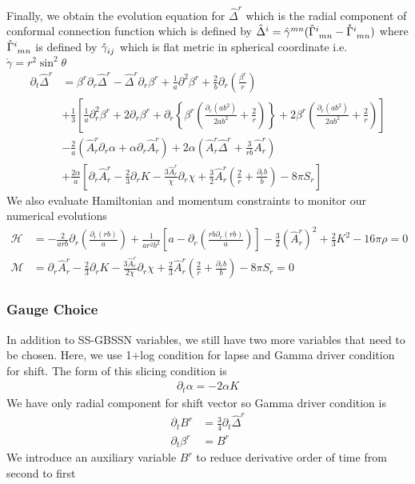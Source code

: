 \documentclass[prd]{revtex4}
\begin{document}
Finally, we obtain the evolution equation for $\hat{\Delta}^r$ which is the radial component of conformal connection function which is defined by $\hat{\Delta}^i = \hat{\gamma}^{mn}( \hat{\Gamma}\indices{^i_{mn}} - \mathring{\Gamma}\indices{^i_{mn}})$ where $\mathring{\Gamma}\indices{^i_{mn}}$ is defined by $\mathring{\gamma}\indices{_{ij}}$ which is flat metric in spherical coordinate i.e. $\mathring{\gamma}=r^2 \sin^2 \theta$
\begin{align}
\partial_t \hat{\Delta}^r &= \beta^r \partial_r \hat{\Delta}^r - \hat{\Delta}^r \partial_r \beta^r + \frac{1}{a} \partial^2 \beta^r + \frac{2}{b} \partial_r \left(\frac{\beta^r}{r} \right) \nonumber \\
&+\frac{1}{3}\left[\frac{1}{a} \partial_r^2 \beta^r + 2 \partial_r \beta^r +\partial_r \left\{ \beta^r \left(\frac{\partial_r (a b^2)}{2 a b^2} + \frac{2}{r}\right)\right\} + 2 \beta^r \left(\frac{\partial_r (a b^2)}{2 a b^2} + \frac{2}{r}\right)\right]  \nonumber \\
&-\frac{2}{a} (\hat{A}^r_r \partial_r \alpha + \alpha \partial_r \hat{A}^r_r) + 2 \alpha \left(\hat{A}^r_r \hat{\Delta}^r + \frac{3}{rb} \hat{A}^r_r \right) \nonumber \\
&+ \frac{2\alpha}{a} \left[ \partial_r \hat{A}^r_r - \frac{2}{3} \partial_r K - \frac{3\hat{A}^r_r}{\chi} \partial_r \chi + \frac{3}{2} \hat{A}^r_r \left(\frac{2}{r} + \frac{\partial_r b}{b} \right) - 8 \pi S_r \right]
\end{align}
We also evaluate Hamiltonian and momentum constraints to monitor our numerical evolutions
\begin{align}
\mathcal{H} &= -\frac{2}{arb} \partial_r \left(\frac{\partial_r (rb)}{a} \right) + \frac{1}{ar^2b^2} \left[a-\partial_r \left(\frac{rb \partial_r (rb)}{a} \right) \right] - \frac{3}{2} (\hat{A}^r_r)^2 + \frac{2}{3} K^2 - 16 \pi \rho = 0 \\
\mathcal{M} &= \partial_r \hat{A}^r_r - \frac{2}{3} \partial_r K - \frac{3 \hat{A}^r_r}{2\chi}\partial_r \chi + \frac{2}{3} \hat{A}^r_r \left(\frac{2}{r} + \frac{\partial_r b}{b} \right) - 8 \pi S_r = 0
\end{align}
\subsubsection{Gauge Choice}
In addition to SS-GBSSN variables, we still have two more variables that need to be chosen. Here, we use 1+log condition for lapse and Gamma driver condition for shift.
The form of this slicing condition is
\begin{align}
\partial_t \alpha = -2\alpha K
\end{align}
We have only radial component for shift vector so Gamma driver condition is
\begin{align}
\partial_t B^r &= \frac{3}{4} \partial_t \hat{\Delta}^r \\
\partial_t \beta^r &= B^r
\end{align}
We introduce an auxiliary variable $B^r$ to reduce derivative order of time from second to first
\end{document}
